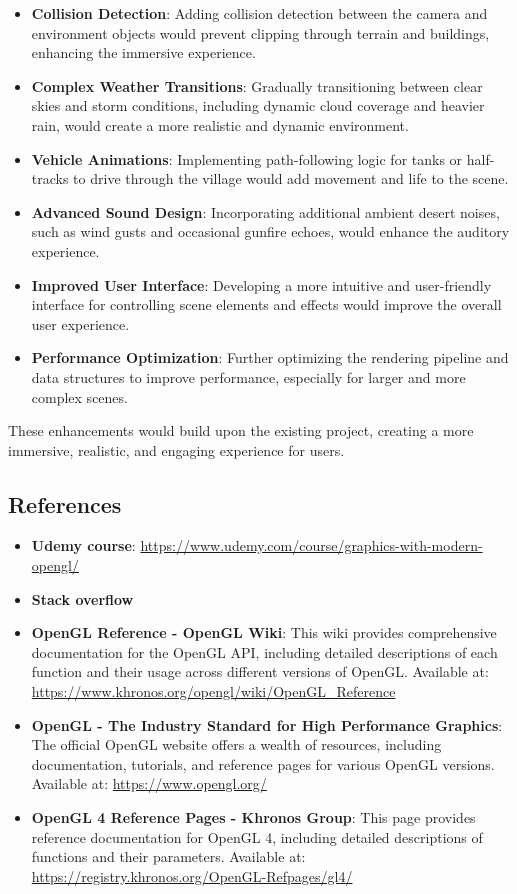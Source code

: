 \documentclass[12pt]{article}
\begin{document}
	\begin{itemize}
		\item \textbf{Collision Detection}: Adding collision detection between the camera and environment objects would prevent clipping through terrain and buildings, enhancing the immersive experience.
		\item \textbf{Complex Weather Transitions}: Gradually transitioning between clear skies and storm conditions, including dynamic cloud coverage and heavier rain, would create a more realistic and dynamic environment.
		\item \textbf{Vehicle Animations}: Implementing path-following logic for tanks or half-tracks to drive through the village would add movement and life to the scene.
		\item \textbf{Advanced Sound Design}: Incorporating additional ambient desert noises, such as wind gusts and occasional gunfire echoes, would enhance the auditory experience.
		\item \textbf{Improved User Interface}: Developing a more intuitive and user-friendly interface for controlling scene elements and effects would improve the overall user experience.
		\item \textbf{Performance Optimization}: Further optimizing the rendering pipeline and data structures to improve performance, especially for larger and more complex scenes.
	\end{itemize}
	
	These enhancements would build upon the existing project, creating a more immersive, realistic, and engaging experience for users.
	
	\subsection{References}
	\begin{itemize}
		\item \textbf{Udemy course}:  \url{https://www.udemy.com/course/graphics-with-modern-opengl/}
		\item \textbf{Stack overflow}
		\item \textbf{OpenGL Reference - OpenGL Wiki}: This wiki provides comprehensive documentation for the OpenGL API, including detailed descriptions of each function and their usage across different versions of OpenGL. Available at: \url{https://www.khronos.org/opengl/wiki/OpenGL_Reference}
		\item \textbf{OpenGL - The Industry Standard for High Performance Graphics}: The official OpenGL website offers a wealth of resources, including documentation, tutorials, and reference pages for various OpenGL versions. Available at: \url{https://www.opengl.org/}
		\item \textbf{OpenGL 4 Reference Pages - Khronos Group}: This page provides reference documentation for OpenGL 4, including detailed descriptions of functions and their parameters. Available at: \url{https://registry.khronos.org/OpenGL-Refpages/gl4/}
	\end{itemize}
	
	
\end{document}
